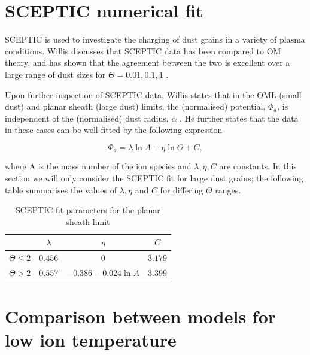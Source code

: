 \documentclass{article}
\begin{document}
    
\newpage 

\section{SCEPTIC numerical fit}

\smallskip

SCEPTIC is used to investigate the charging of dust grains in a variety
of plasma conditions. Willis discusses that SCEPTIC data has been compared
to OM theory, and has shown that the agreement between the two is excellent over a large range of dust sizes 
for $\Theta = 0.01,0.1,1$ \cite{ScepticFit}.

\medskip

Upon further inspection of SCEPTIC data, Willis states that in the OML (small dust)
and planar sheath (large dust) limits, the (normalised) potential, $\Phi_a$, is independent of the (normalised)
dust radius, $\alpha$ \cite{ScepticFit}. He further states that the data in these cases can
be well fitted by the following expression

\begin{equation}\label{eq:SCEPTICfit}
\Phi_a = \lambda \ln{A} + \eta \ln{\Theta} + C,
\end{equation}

\smallskip

\noindent where A is the mass number of the ion species and $\lambda, \eta, C$ are 
constants. In this section we will only consider the SCEPTIC
fit for large dust grains; the following table summarises the values of $\lambda, \eta$ and $C$
for differing $\Theta$ ranges.

\begin{table}[h!]
\begin{center}
    \caption{SCEPTIC fit parameters for the planar sheath limit}
    \label{tab:ValueTable}
    \begin{tabular}{c|c|c|c} 
    \hline
    & $\lambda$ & $\eta$ & $C$ \\
    \hline
    $\Theta \leq 2$ & $0.456$ & $0$ & $3.179$\\
    $\Theta > 2$ & $0.557$ & $-0.386 - 0.024\ln{A}$ & $3.399$\\
    \end{tabular}
\end{center}
\end{table}


\newpage 

\section{Comparison between models for low ion temperature}
\end{document}
